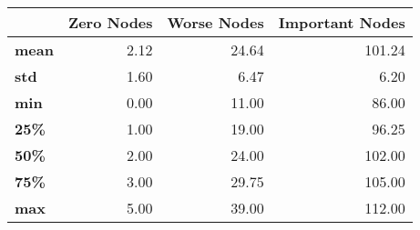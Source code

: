 \begin{tabular}{lrrr}
\toprule
{} &  Zero Nodes &  Worse Nodes &  Important Nodes \\
\midrule
\textbf{mean} &        2.12 &        24.64 &           101.24 \\
\textbf{std } &        1.60 &         6.47 &             6.20 \\
\textbf{min } &        0.00 &        11.00 &            86.00 \\
\textbf{25\% } &        1.00 &        19.00 &            96.25 \\
\textbf{50\% } &        2.00 &        24.00 &           102.00 \\
\textbf{75\% } &        3.00 &        29.75 &           105.00 \\
\textbf{max } &        5.00 &        39.00 &           112.00 \\
\bottomrule
\end{tabular}
